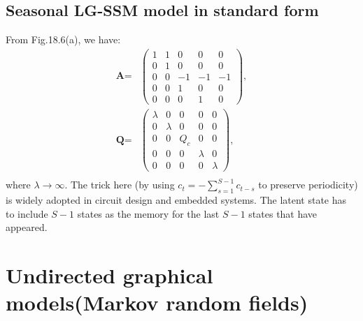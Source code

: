 \documentclass[UTF8]{ctexart}
\begin{document}
\subsection{Seasonal LG-SSM model in standard form}
From Fig.18.6(a), we have:
$$
\begin{aligned}
\textbf{A}=&\begin{pmatrix}
1 & 1 & 0 & 0 & 0 \\
0 & 1 & 0 & 0 & 0 \\
0 & 0 & -1 & -1 & -1 \\
0 & 0 & 1 & 0 & 0 \\
0 & 0 & 0 & 1 & 0
\end{pmatrix}, \\
\textbf{Q}=&\begin{pmatrix}
\lambda & 0 & 0 & 0 & 0 \\
0 & \lambda & 0 & 0 & 0 \\
0 & 0 & Q_{c} & 0 & 0 \\
0 & 0 & 0 & \lambda & 0 \\
0 & 0 & 0 & 0 & \lambda
\end{pmatrix}, \\
\end{aligned}
$$
where $\lambda\rightarrow\infty$.
The trick here (by using $c_{t}=-\sum_{s=1}^{S-1}c_{t-s}$ to preserve periodicity) is widely adopted in circuit design and embedded systems.
The latent state has to include $S-1$ states as the memory for the last $S-1$ states that have appeared.  

\newpage
\section{Undirected graphical models(Markov random fields)}
\end{document}
